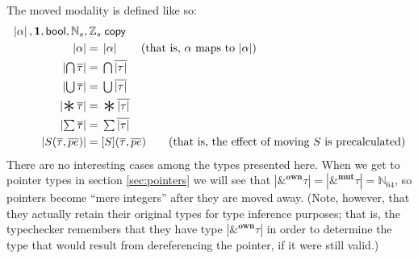 \documentclass[acmsmall,nonacm]{acmart}
\DeclareMathOperator*{\Sep}{\scalerel*{\ast}{\sum}}
\newcommand*{\N}{\mathbb{N}}
\newcommand*{\Z}{\mathbb{Z}}
\newcommand{\core}[1]{\left| #1 \right|}
\begin{document}
The moved modality is defined like so:
\begin{align*}
  \core\alpha,\mathbf{1}, \mathsf{bool},\N_s, \Z_s&\;\mathsf{copy}\\
  \core\alpha={}&\core\alpha\qquad\mbox{(that is, $\alpha$ maps to $\core\alpha$)}\\
  \core{\textstyle\bigcap\overline{\tau}}={}&\textstyle\bigcap\overline{\core\tau}\\
  \core{\textstyle\bigcup\overline{\tau}}={}&\textstyle\bigcup\overline{\core\tau}\\
  \core{\textstyle\Sep\overline{\tau}}={}&\textstyle\Sep\overline{\core\tau}\\
  \core{\textstyle\sum\overline{\tau}}={}&\textstyle\sum\overline{\core\tau}\\
  \core{S(\overline{\tau},\overline{pe})}={}&[S](\overline{\tau},\overline{pe})\qquad\mbox{(that is, the effect of moving $S$ is precalculated)}
\end{align*}
There are no interesting cases among the types presented here. When we get to pointer types in section \ref{sec:pointers} we will see that $\core{\&^\mathbf{own}\tau}=\core{\&^\mathbf{mut}\tau}=\N_{64}$, so pointers become ``mere integers'' after they are moved away. (Note, however, that they actually retain their original types for type inference purposes; that is, the typechecker remembers that they have type $\core{\&^\mathbf{own}\tau}$ in order to determine the type that would result from dereferencing the pointer, if it were still valid.)
\end{document}
